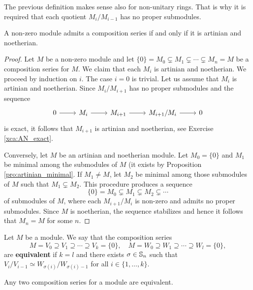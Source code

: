The previous definition makes sense also for non-unitary rings. That is why
it is required that each quotient $M_i/M_{i-1}$ has no proper submodules.

\begin{theorem}
	\label{thm:serie_de_composicion}
	A non-zero module admits a composition series if and only if it is artinian and noetherian.
\end{theorem}

\begin{proof}
	Let $M$ be a non-zero module and let $\{0\}=M_0\subsetneq
	M_1\subsetneq\cdots\subsetneq M_n=M$ be a composition series for $M$.
	We claim that each $M_i$ is artinian and noetherian. We proceed by induction on $i$. The case
	$i=0$ is trivial. Let us assume that $M_i$ is artinian and noetherian. Since 
	$M_i/M_{i+1}$ has no proper submodules and the sequence 
	\[
	\begin{tikzcd}
		0 \arrow{r}
		& M_i \arrow{r}
		& M_{i+1} \arrow{r}
		& M_{i+1}/M_i \arrow{r}
		& 0
	\end{tikzcd}
	\]
	is exact, it follows that 
	$M_{i+1}$ is artinian and noetherian, see Exercise \ref{xca:AN_exact}. 

    Conversely, let $M$ be an artinian and noetherian module. Let $M_0=\{0\}$ and 
    $M_1$ be minimal among the submodules of $M$ (it exists by Proposition \ref{pro:artinian_minimal}.
    If $M_1\ne M$, let 
	$M_2$ be minimal among those submodules of $M$ such that $M_1\subsetneq M_2$. This procedure
	produces a sequence 
	\[
		\{0\}=M_0\subsetneq M_1\subsetneq M_2\subsetneq\cdots
	\]
	of submodules of $M$, where each $M_{i+1}/M_i$ is non-zero and admits no
	proper submodules. Since $M$ is noetherian, the sequence stabilizes and
	hence it follows that $M_n=M$ for some $n$. 
\end{proof}

\begin{definition}
    Let $M$ be a module. 
	We say that the composition series
	\[
	M=V_0\supseteq V_1\supseteq\cdots\supseteq V_k=\{0\},
	\quad
	M=W_0\supseteq W_1\supseteq\cdots\supseteq W_l=\{0\},
	\]
	are \textbf{equivalent} if $k=l$ and there exists 
	$\sigma\in\mathbb{S}_n$ such that 
	$V_{i}/V_{i-1}\simeq W_{\sigma(i)}/W_{\sigma(i)-1}$
	for all $i\in\{1,\dots,k\}$.
\end{definition}

\begin{theorem}
	\label{thm:JordanHolder}
	Any two composition series for a module are equivalent. 
\end{theorem}


